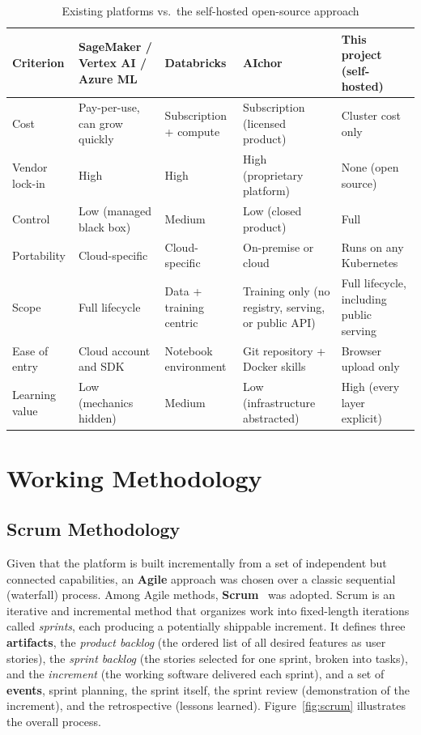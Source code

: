 \begin{table}[H]\centering
\caption{Existing platforms vs.\ the self-hosted open-source approach}
\label{tab:comparison}
\renewcommand{\arraystretch}{1.3}
\small
\begin{tabularx}{\textwidth}{|>{\raggedright\arraybackslash}p{2.1cm}|X|X|X|X|}
\hline
\textbf{Criterion} & \textbf{SageMaker / Vertex AI / Azure ML} & \textbf{Databricks} & \textbf{AIchor} & \textbf{This project (self-hosted)}\\
\hline
Cost            & Pay-per-use, can grow quickly & Subscription + compute & Subscription (licensed product) & Cluster cost only\\
\hline
Vendor lock-in  & High & High & High (proprietary platform) & None (open source)\\
\hline
Control         & Low (managed black box) & Medium & Low (closed product) & Full\\
\hline
Portability     & Cloud-specific & Cloud-specific & On-premise or cloud & Runs on any Kubernetes\\
\hline
Scope           & Full lifecycle & Data + training centric & Training only (no registry, serving, or public API) & Full lifecycle, including public serving\\
\hline
Ease of entry   & Cloud account and SDK & Notebook environment & Git repository + Docker skills & Browser upload only\\
\hline
Learning value  & Low (mechanics hidden) & Medium & Low (infrastructure abstracted) & High (every layer explicit)\\
\hline
\end{tabularx}
\end{table}

\section{Working Methodology}
\label{sec:scrum}

\subsection{Scrum Methodology}
Given that the platform is built incrementally from a set of independent but
connected capabilities, an \textbf{Agile} approach was chosen over a classic
sequential (waterfall) process. Among Agile methods, \textbf{Scrum}~\cite{scrum_guide}
was adopted. Scrum is an iterative and incremental method that organizes work into
fixed-length iterations called \emph{sprints}, each producing a potentially
shippable increment. It defines three \textbf{artifacts}, the \emph{product
backlog} (the ordered list of all desired features as user stories), the
\emph{sprint backlog} (the stories selected for one sprint, broken into tasks), and
the \emph{increment} (the working software delivered each sprint), and a set of
\textbf{events}, sprint planning, the sprint itself, the sprint review
(demonstration of the increment), and the retrospective (lessons learned).
Figure~\ref{fig:scrum} illustrates the overall process.

